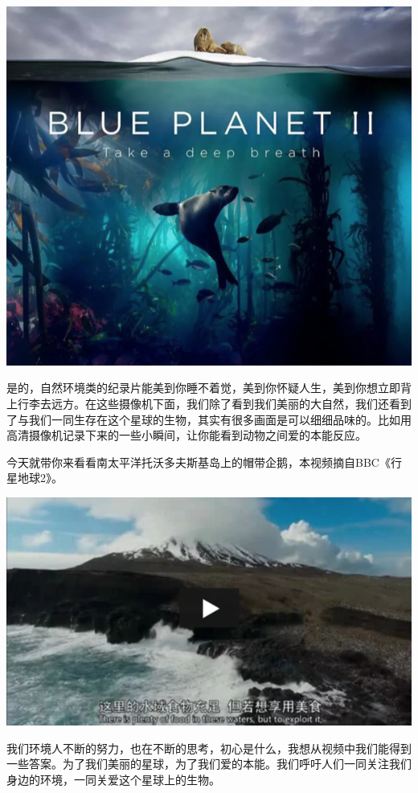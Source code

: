 \documentclass[
]{book}
\begin{document}
\includegraphics[width=8.33in]{images/xf4}

是的，自然环境类的纪录片能美到你睡不着觉，美到你怀疑人生，美到你想立即背上行李去远方。在这些摄像机下面，我们除了看到我们美丽的大自然，我们还看到了与我们一同生存在这个星球的生物，其实有很多画面是可以细细品味的。比如用高清摄像机记录下来的一些小瞬间，让你能看到动物之间爱的本能反应。

今天就带你来看看南太平洋托沃多夫斯基岛上的帽带企鹅，本视频摘自BBC《行星地球2》。

\includegraphics[width=8.33in]{images/xf5}

我们环境人不断的努力，也在不断的思考，初心是什么，我想从视频中我们能得到一些答案。为了我们美丽的星球，为了我们爱的本能。我们呼吁人们一同关注我们身边的环境，一同关爱这个星球上的生物。
\end{document}
